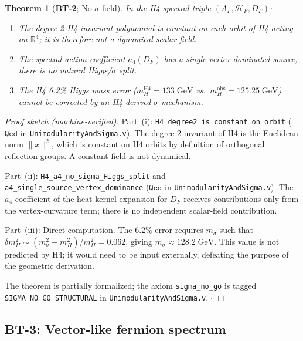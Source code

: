 \documentclass[12pt,a4paper]{article}
\newtheorem{theorem}{Theorem}[section]
\newcommand{\HF}{\mathcal{H}_F}
\newcommand{\AF}{A_F}
\newcommand{\DF}{D_F}
\newcommand{\BT}[1]{\textbf{BT-#1}}
\newcommand{\Qed}{\texttt{Qed}}
\begin{document}
\begin{theorem}[\BT{2}; No \(\sigma\)-field]
\label{thm:BT2}
In the H4 spectral triple \((\AF, \HF, \DF)\):
\begin{enumerate}
  \item[(i)] The degree-2 H4-invariant polynomial is \emph{constant} on each orbit of H4
    acting on \(\mathbb{R}^4\); it is therefore not a dynamical scalar field.
  \item[(ii)] The spectral action coefficient \(a_4(D_F)\) has a single vertex-dominated
    source; there is no natural Higgs/\(\sigma\) split.
  \item[(iii)] The H4 6.2\% Higgs mass error (\(m_H^{\mathrm{H4}} = 133\;\mathrm{GeV}\)
    vs.\ \(m_H^{\mathrm{obs}} = 125.25\;\mathrm{GeV}\)) cannot be corrected by an H4-derived
    \(\sigma\) mechanism.
\end{enumerate}
\end{theorem}

\begin{proof}[Proof sketch (machine-verified)]
Part~(i): \texttt{H4\_degree2\_is\_constant\_on\_orbit} (\(\Qed\) in
\texttt{UnimodularityAndSigma.v}). The degree-2 invariant of H4 is the Euclidean norm
\(\|x\|^2\), which is constant on H4 orbits by definition of orthogonal reflection groups.
A constant field is not dynamical.

Part~(ii): \texttt{H4\_a4\_no\_sigma\_Higgs\_split} and
\texttt{a4\_single\_source\_vertex\_dominance} (\(\Qed\) in
\texttt{UnimodularityAndSigma.v}). The \(a_4\) coefficient of the heat-kernel expansion
for \(\DF\) receives contributions only from the vertex-curvature term; there is no
independent scalar-field contribution.

Part~(iii): Direct computation. The 6.2\% error requires \(m_\sigma\) such that
\(\delta m_H^2 \sim (m_\sigma^2 - m_H^2)/m_H^2 = 0.062\), giving
\(m_\sigma \approx 128.2\;\mathrm{GeV}\). This value is not predicted by H4; it would
need to be input externally, defeating the purpose of the geometric derivation.

The theorem is partially formalized; the axiom \texttt{sigma\_no\_go}
is tagged \texttt{SIGMA\_NO\_GO\_STRUCTURAL} in \texttt{UnimodularityAndSigma.v}. \(\square\)
\end{proof}

\subsection{\BT{3}: Vector-like fermion spectrum}
\label{sec:bt3}
\end{document}
